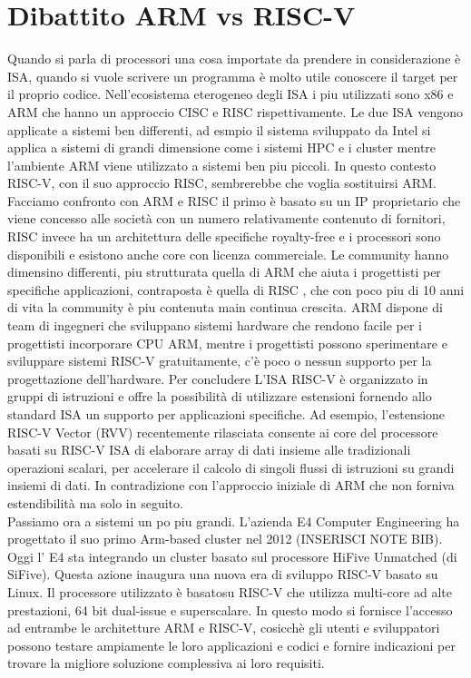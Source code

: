 \documentclass[12pt,a4paper]{report}
\begin{document}
\chapter{Dibattito ARM vs RISC-V}

Quando si parla di processori una cosa importate da prendere in considerazione è ISA, quando si vuole scrivere un programma è molto utile conoscere il target per il proprio codice. Nell'ecosistema eterogeneo degli ISA i piu utilizzati sono x86 e ARM che hanno un approccio CISC e RISC rispettivamente. Le due ISA vengono applicate a sistemi ben differenti, ad esmpio il sistema sviluppato da Intel si applica a sistemi di grandi dimensione  come i sistemi HPC e i cluster mentre l'ambiente ARM viene utilizzato a sistemi ben piu piccoli. In questo contesto RISC-V, con il suo approccio RISC, sembrerebbe che voglia sostituirsi  ARM. \\
Facciamo confronto con ARM e RISC il primo è basato su un IP proprietario che viene concesso alle società con un numero relativamente contenuto di fornitori, RISC invece ha un architettura delle specifiche royalty-free e i processori sono disponibili e esistono anche core con licenza commerciale. Le community hanno dimensino differenti, piu strutturata quella di ARM che aiuta i progettisti per specifiche applicazioni, contraposta è quella di RISC , che con poco piu di 10 anni di vita la community è piu contenuta main continua crescita. ARM dispone di team di ingegneri che sviluppano sistemi hardware che rendono facile per i progettisti incorporare CPU ARM, mentre i progettisti possono sperimentare e sviluppare sistemi RISC-V gratuitamente, c’è poco o nessun supporto per la progettazione dell’hardware. Per concludere L’ISA RISC-V è organizzato in gruppi di istruzioni  e offre la possibilità di utilizzare estensioni fornendo allo standard ISA  un supporto per applicazioni specifiche. Ad esempio, l’estensione RISC-V Vector (RVV) recentemente rilasciata consente ai core del processore basati su RISC-V ISA di elaborare array di dati insieme alle tradizionali operazioni scalari, per accelerare il calcolo di singoli flussi di istruzioni su grandi insiemi di dati.  In contradizione con l'approccio iniziale di ARM che non forniva estendibilità ma solo in seguito.\\
Passiamo ora a sistemi un po piu grandi.  L'azienda E4 Computer Engineering ha progettato il suo primo Arm-based cluster nel 2012 (INSERISCI NOTE BIB).  Oggi l' E4 sta  integrando un cluster basato sul processore HiFive Unmatched (di SiFive). Questa azione inaugura una nuova era di sviluppo RISC-V basato su Linux. Il processore utilizzato è basatosu RISC-V che utilizza multi-core ad alte prestazioni, 64 bit dual-issue e superscalare.  In questo modo si fornisce l’accesso ad entrambe le architetture ARM e RISC-V, cosicchè gli utenti e sviluppatori possono testare ampiamente le loro applicazioni e codici e fornire indicazioni per trovare la migliore soluzione complessiva ai loro requisiti.
\end{document}
